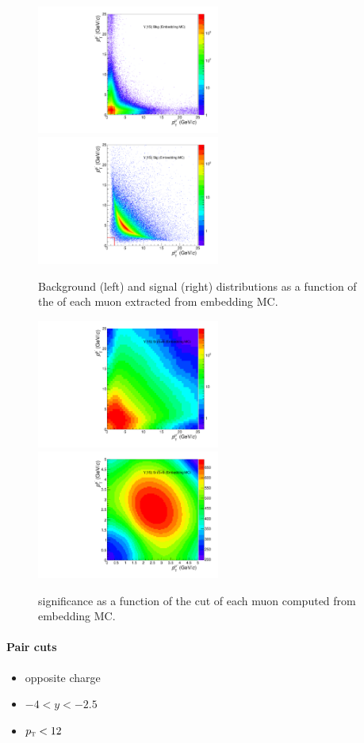 \begin{figure}[!t]
\begin{center}
\includegraphics[width=6cm]{MuonPtCut/background.pdf}
\includegraphics[width=6cm]{MuonPtCut/signal.pdf}
\end{center}
\caption{\label{sigbkg}Background (left) and \ups signal (right) distributions as a function of the \pt of each muon extracted from embedding MC.}
\end{figure}

\begin{figure}[!t]
\begin{center}
\includegraphics[width=6cm]{MuonPtCut/significance_rebin10_ptmax25.pdf}
\includegraphics[width=6cm]{MuonPtCut/significance_rebin1_ptmax5_LinearScale.pdf}
\end{center}
\caption{\label{signifi}\ups significance as a function of the \pt cut of each muon computed from embedding MC.}
\end{figure}


\paragraph{Pair cuts}
\begin{itemize}
\item opposite charge
\item $-4<y<-2.5$
\item $p_{\mathrm{\textsc{t}}}<12$
\end{itemize}

